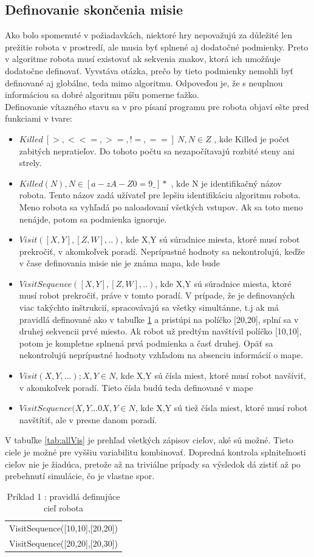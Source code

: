 \subsection{ Definovanie skončenia misie }
Ako bolo spomenuté v požiadavkách, niektoré hry nepovažujú za důležité len prežitie robota v prostredí, ale musia byť splnené aj dodatočné podmienky. Preto v algoritme robota musí existovať ak sekvenia znakov, ktorá ich umožňuje dodatočne definovať. Vyvstáva otázka, prečo by tieto podmienky nemohli byť definované aj globálne, teda mimo algoritmu. Odpoveďou je, že s neuplnou informáciou sa dobré algoritmu píšu pomerne ťažko.\\%
Definovanie vítazného stavu sa v pro písaní programu pre robota objaví ešte pred funkciami v tvare:
\begin{itemize}
\item $Killed\ [>, < <=, >=, !=, ==]\ N, N \in Z$ , kde Killed je počet zabitých nepratieľov. Do tohoto počtu sa nezapočítavajú rozbité steny ani strely.
\item $Killed( N ), N \in [a-zA-Z0=9\_]*$ , kde N je identifikačný názov robota. Tento názov zadá užívateľ pre lepšiu identifikáciu algoritmu robota. Meno robota sa vyhľadá po naloadovaní všetkých vstupov. Ak sa toto meno nenájde, potom sa podmienka ignoruje.
\item $Visit([X,Y], [Z,W],..)$, kde X,Y sú súradnice miesta, ktoré musí robot prekročiť, v akomkoľvek poradí. Neprípustné hodnoty sa nekontrolujú, keďže v čase definovania misie nie je známa mapa, kde bude
\item $VisitSequence([X,Y], [Z,W],..)$, kde X,Y sú súradnice miesta, ktoré musí robot prekročiť, práve v tomto poradí. V prípade, že je definovaných viac takýchto inštrukcií, spracovávajú sa všetky simultánne, t.j ak má pravidlá definované ako v tabuľke \ref{tab:pr1} a pristúpi na políčko [20,20], splní sa v druhej sekvencii prvé miesto. Ak robot už predtým navštívil políčko [10,10], potom je kompletne splnená prvá podmienka a časť druhej. Opäť sa nekontrolujú neprípustné hodnoty vzhľadom na absenciu informácií o mape.
\item $Visit(X, Y,...); X,Y \in N $, kde X,Y sú čísla miest, ktoré musí robot navšíviť, v akomkoľvek poradí. Tieto čísla budú teda definované v mape
\item $VisitSequence(X,Y...0 X,Y \in N$, kde X,Y sú tiež čísla miest, ktoré musí robot navštítiť, ale v presne danom poradí.
\end{itemize}
V tabuľke \ref{tab:allVis} je prehľad všetkých zápisov cieľov, aké sú možné. Tieto ciele je možné pre vyššiu variabilitu kombinovať. Dopredná kontrola splniteľnosti cieľov nie je žiadúca, pretože až na triviálne prípady sa výsledok dá zistiť až po prebehnutí simulácie, čo je vlastne spor.
\begin{table}
\centering
\begin{tabular}{l}
VisitSequence([10,10],[20,20])\\
VisitSequence([20,20],[20,30])\\
\end{tabular}
\caption {Príklad 1 : pravidlá definujúce cieľ robota} %
\label{tab:pr1}
\end{table}

